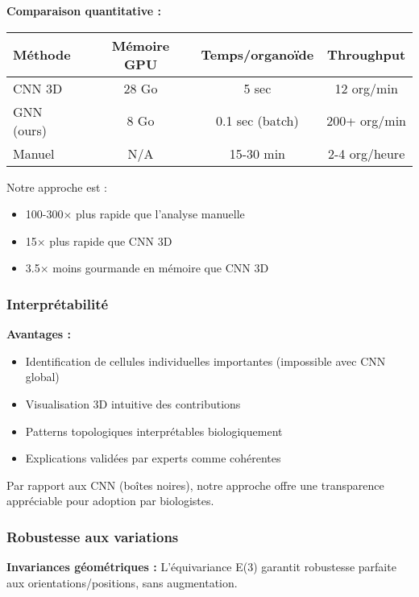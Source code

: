 \textbf{Comparaison quantitative :}

\begin{center}
\begin{tabular}{|l|c|c|c|}
\hline
\textbf{Méthode} & \textbf{Mémoire GPU} & \textbf{Temps/organoïde} & \textbf{Throughput} \\
\hline
CNN 3D & 28 Go & 5 sec & 12 org/min \\
GNN (ours) & 8 Go & 0.1 sec (batch) & 200+ org/min \\
Manuel & N/A & 15-30 min & 2-4 org/heure \\
\hline
\end{tabular}
\end{center}

Notre approche est :
\begin{itemize}
    \item 100-300× plus rapide que l'analyse manuelle
    \item 15× plus rapide que CNN 3D
    \item 3.5× moins gourmande en mémoire que CNN 3D
\end{itemize}

\subsubsection{Interprétabilité}

\textbf{Avantages :}
\begin{itemize}
    \item Identification de cellules individuelles importantes (impossible avec CNN global)
    \item Visualisation 3D intuitive des contributions
    \item Patterns topologiques interprétables biologiquement
    \item Explications validées par experts comme cohérentes
\end{itemize}

Par rapport aux CNN (boîtes noires), notre approche offre une transparence appréciable pour adoption par biologistes.

\subsubsection{Robustesse aux variations}

\textbf{Invariances géométriques :}
L'équivariance E(3) garantit robustesse parfaite aux orientations/positions, sans augmentation.

